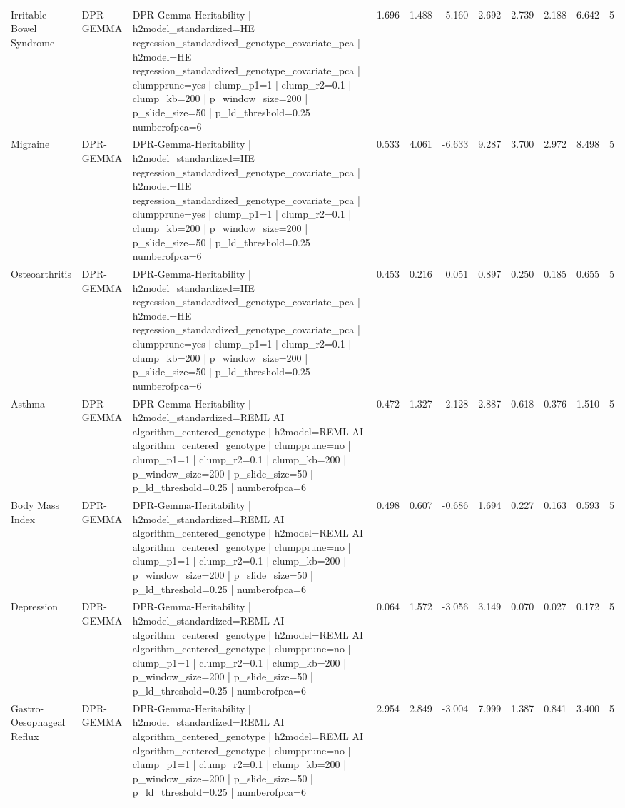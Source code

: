 \begin{landscape}
\begin{longtable}{p{2.4cm}p{1.8cm}p{6.0cm}rrrrrrrr}
Irritable Bowel Syndrome & DPR-GEMMA & DPR-Gemma-Heritability | h2model\_standardized=HE regression\_standardized\_genotype\_covariate\_pca | h2model=HE regression\_standardized\_genotype\_covariate\_pca | clumpprune=yes | clump\_p1=1 | clump\_r2=0.1 | clump\_kb=200 | p\_window\_size=200 | p\_slide\_size=50 | p\_ld\_threshold=0.25 | numberofpca=6 & -1.696 & 1.488 & -5.160 & 2.692 & 2.739 & 2.188 & 6.642 & 5 \\
Migraine & DPR-GEMMA & DPR-Gemma-Heritability | h2model\_standardized=HE regression\_standardized\_genotype\_covariate\_pca | h2model=HE regression\_standardized\_genotype\_covariate\_pca | clumpprune=yes | clump\_p1=1 | clump\_r2=0.1 | clump\_kb=200 | p\_window\_size=200 | p\_slide\_size=50 | p\_ld\_threshold=0.25 | numberofpca=6 & 0.533 & 4.061 & -6.633 & 9.287 & 3.700 & 2.972 & 8.498 & 5 \\
Osteoarthritis & DPR-GEMMA & DPR-Gemma-Heritability | h2model\_standardized=HE regression\_standardized\_genotype\_covariate\_pca | h2model=HE regression\_standardized\_genotype\_covariate\_pca | clumpprune=yes | clump\_p1=1 | clump\_r2=0.1 | clump\_kb=200 | p\_window\_size=200 | p\_slide\_size=50 | p\_ld\_threshold=0.25 | numberofpca=6 & 0.453 & 0.216 & 0.051 & 0.897 & 0.250 & 0.185 & 0.655 & 5 \\
Asthma & DPR-GEMMA & DPR-Gemma-Heritability | h2model\_standardized=REML AI algorithm\_centered\_genotype | h2model=REML AI algorithm\_centered\_genotype | clumpprune=no | clump\_p1=1 | clump\_r2=0.1 | clump\_kb=200 | p\_window\_size=200 | p\_slide\_size=50 | p\_ld\_threshold=0.25 | numberofpca=6 & 0.472 & 1.327 & -2.128 & 2.887 & 0.618 & 0.376 & 1.510 & 5 \\
Body Mass Index & DPR-GEMMA & DPR-Gemma-Heritability | h2model\_standardized=REML AI algorithm\_centered\_genotype | h2model=REML AI algorithm\_centered\_genotype | clumpprune=no | clump\_p1=1 | clump\_r2=0.1 | clump\_kb=200 | p\_window\_size=200 | p\_slide\_size=50 | p\_ld\_threshold=0.25 | numberofpca=6 & 0.498 & 0.607 & -0.686 & 1.694 & 0.227 & 0.163 & 0.593 & 5 \\
Depression & DPR-GEMMA & DPR-Gemma-Heritability | h2model\_standardized=REML AI algorithm\_centered\_genotype | h2model=REML AI algorithm\_centered\_genotype | clumpprune=no | clump\_p1=1 | clump\_r2=0.1 | clump\_kb=200 | p\_window\_size=200 | p\_slide\_size=50 | p\_ld\_threshold=0.25 | numberofpca=6 & 0.064 & 1.572 & -3.056 & 3.149 & 0.070 & 0.027 & 0.172 & 5 \\
Gastro-Oesophageal Reflux & DPR-GEMMA & DPR-Gemma-Heritability | h2model\_standardized=REML AI algorithm\_centered\_genotype | h2model=REML AI algorithm\_centered\_genotype | clumpprune=no | clump\_p1=1 | clump\_r2=0.1 | clump\_kb=200 | p\_window\_size=200 | p\_slide\_size=50 | p\_ld\_threshold=0.25 | numberofpca=6 & 2.954 & 2.849 & -3.004 & 7.999 & 1.387 & 0.841 & 3.400 & 5 \\

\end{longtable}
\end{landscape}
